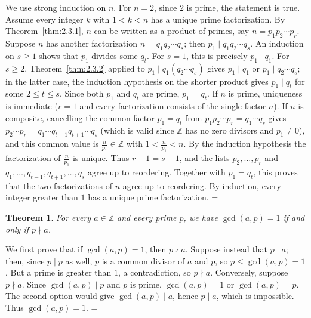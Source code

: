 \documentclass[11pt]{article}
\makeatletter
\let\nt@closedisplay\]
\def\nt@guardedclose{\@ifnextchar\par{\nt@closeafterpar}{\@ifnextchar\end{\postdisplaypenalty\@M\nt@closedisplay}{\nt@closedisplay}}}
\def\nt@closeafterpar\par{\@ifnextchar\par{\nt@closeafterpar}{\@ifnextchar\end{\postdisplaypenalty\@M\nt@closedisplay\par}{\nt@closedisplay\par}}}
\renewenvironment{proof}[1][\proofname]{\par
  \pushQED{\qed}\normalfont\topsep\medskipamount\edef\nt@afterproof{\@endparpenalty=\the\@endparpenalty\relax}\@beginparpenalty\@M\@endparpenalty\@M\let\]\nt@guardedclose\trivlist\item[]\textit{#1\@addpunct{.}} \ignorespaces}{\ifvmode\addpenalty\@M\fi\popQED\nt@afterproof\endtrivlist\@endpefalse}
\theoremstyle{ntstyle}
\newtheorem{theorem}{Theorem}[subsection]
\makeatother
\begin{document}
\begin{proof} We use strong induction on $n$. For $n = 2$,
  since $2$ is prime, the statement is true. Assume every integer $k$
  with $1 < k < n$ has a unique prime factorization. By Theorem~\ref{thm:2.3.1}, $n$ can be written as a product of
  primes, say
  $n=p_1p_2\cdots p_r$. Suppose $n$ has another factorization $n=q_1q_2 \cdots q_s$; then $p_1 \mid q_1 q_2 \cdots q_s$.
  An induction on $s\ge1$ shows that $p_1$ divides some $q_t$.
  For $s=1$, this is precisely $p_1\mid q_1$.
  For $s\ge2$, Theorem~\ref{thm:2.3.2} applied to
  $p_1\mid q_1(q_2\cdots q_s)$ gives $p_1\mid q_1$ or
  $p_1\mid q_2\cdots q_s$; in the latter case, the induction hypothesis
  on the shorter product gives $p_1\mid q_t$ for some $2\le t\le s$.
  Since both $p_1$
  and $q_t$ are prime, $p_1 = q_t$. If $n$ is prime, uniqueness is
  immediate ($r = 1$ and every factorization consists of the single factor $n$). If $n$ is
  composite, cancelling the common factor $p_1 = q_t$ from $p_1 p_2 \cdots p_r = q_1 \cdots q_s$ gives
  $p_2 \cdots p_r = q_1 \cdots q_{t-1} q_{t+1} \cdots q_s$ (which is valid since $\mathbb{Z}$ has no zero
  divisors and $p_1 \neq 0$), and this common value is $\tfrac{n}{p_1} \in \mathbb{Z}$ with
  $1 < \tfrac{n}{p_1} < n$. By the induction
  hypothesis the factorization of $\tfrac{n}{p_1}$ is unique.
  Thus $r-1=s-1$, and the lists $p_2,\ldots,p_r$ and
  $q_1,\ldots,q_{t-1},q_{t+1},\ldots,q_s$ agree up to reordering.
  Together with $p_1=q_t$, this proves that the two factorizations of $n$
  agree up to reordering. By induction, every
  integer greater than $1$ has a unique prime factorization.
\end{proof}

\begin{theorem}\label{thm:2.3.4} For every $a \in \mathbb{Z}$ and every
  prime $p$, we have $\gcd(a, p) = 1$ if and only if $p \nmid a$.

\end{theorem}

\begin{proof} We first prove that if $\gcd(a, p) = 1$,
  then $p \nmid a$. Suppose instead that $p \mid a$; then, since $p \mid p$ as well, $p$ is a common divisor of $a$
  and $p$, so $p \le \gcd(a, p) = 1$. But a prime is greater than $1$, a contradiction, so
  $p \nmid a$. Conversely, suppose $p \nmid a$. Since
  $\gcd(a, p) \mid p$ and $p$ is prime, $\gcd(a, p) = 1$ or $\gcd(a, p) = p$. The second option would give
  $\gcd(a, p) \mid a$, hence $p \mid a$,
  which is impossible. Thus $\gcd(a, p) = 1$.
\end{proof}
\end{document}
